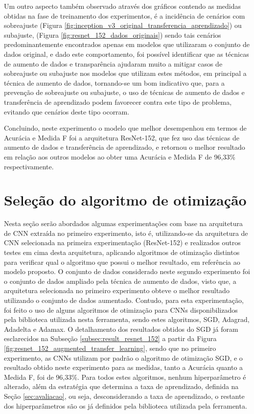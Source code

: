 \documentclass[
	12pt,				%
	oneside,			%
	a4paper,			%
	english,			%
	brazil				%
	]{abntex2ppgsi}
\begin{document}
Um outro aspecto também observado através dos gráficos contendo as medidas obtidas na fase de treinamento dos experimentos, é a incidência de cenários com sobreajuste (Figura \ref{fig:inception_v3_original_transferencia_aprendizado}) ou subajuste, (Figura \ref{fig:resnet_152_dados_originais}) sendo tais cenários predominantemente encontrados apenas em modelos que utilizaram o conjunto de dados original, e dado este comportamento, foi possível identificar que as técnicas de aumento de dados e transparência ajudaram muito a mitigar casos de sobreajuste ou subajuste nos modelos que utilizam estes métodos, em principal a técnica de aumento de dados, tornando-se um bom indicativo que, para a prevenção de sobreajuste ou subajuste, o uso de técnicas de aumento de dados e transferência de aprendizado podem favorecer contra este tipo de problema, evitando que cenários deste tipo ocorram.

Concluindo, neste experimento o modelo que melhor desempenhou em termos de Acurácia e Medida F foi a arquitetura ResNet-152, que fez uso das técnicas de aumento de dados e transferência de aprendizado, e retornou o melhor resultado em relação aos outros modelos ao obter uma Acurácia e Medida F de 96,33\% respectivamente.

\section{Seleção do algoritmo de otimização}
Nesta seção serão abordados algumas experimentações com base na arquitetura de CNN extraída no primeiro experimento, isto é, utilizando-se da arquitetura de CNN selecionada na primeira experimentação (ResNet-152) e realizados outros testes em cima desta arquitetura, aplicando algoritmos de otimização distintos para verificar qual o algoritmo que possui o melhor resultado, em referência ao modelo proposto. O conjunto de dados considerado neste segundo experimento foi o conjunto de dados ampliado pela técnica de aumento de dados, visto que, a arquitetura selecionada no primeiro experimento obteve o melhor resultado utilizando o conjunto de dados aumentado. Contudo, para esta experimentação, foi feito o uso de alguns algoritmos de otimização para CNNs disponibilizados pela biblioteca utilizada nesta ferramenta, sendo estes algoritmos, SGD, Adagrad, Adadelta e Adamax. O detalhamento dos resultados obtidos do SGD já foram esclarecidos na Subseção \ref{subsec:result_resnet_152} a partir da Figura \ref{fig:resnet_152_augmented_transfer_learning}, sendo que no primeiro experimento, as CNNs utilizam por padrão o algoritmo de otimização SGD, e o resultado obtido neste experimento para as medidas, tanto a Acurácia quanto a Medida F, foi de 96,33\%. Para todos estes algoritmos, nenhum hiperparâmetro é alterado, além da estratégia que determina a taxa de aprendizado, definida na Seção \ref{sec:avaliacao}, ou seja, desconsiderando a taxa de aprendizado, o restante dos hiperparâmetros são os já definidos pela biblioteca utilizada pela ferramenta.
\end{document}
